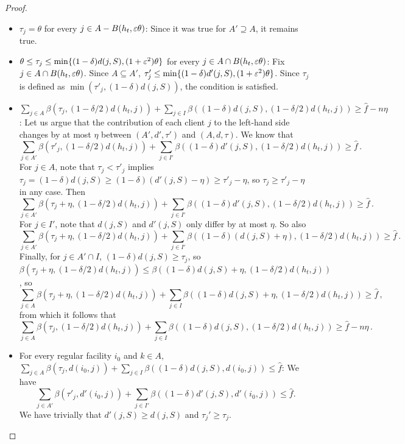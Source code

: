\begin{proof}
\begin{itemize}
    \item $\tau_j = \theta$ for every $j \in A - B(h_t, \varepsilon \theta)$: Since it was true for $A' \supseteq A$, it remains true. 
    \item $\theta \leq \tau_j \leq \min\{(1-\delta)d(j,S),(1+\varepsilon^2)\theta\}$ for every $j \in A \cap B(h_t, \varepsilon \theta)$: Fix $j \in A \cap B(h_t, \varepsilon \theta)$. 
    Since $A \subseteq A'$, $\tau'_j \leq \min\{(1-\delta)d'(j,S),(1+\varepsilon^2)\theta\}$. Since $\tau_j$ is defined as $\min(\tau'_j, (1-\delta)d(j,S))$, the condition is satisfied.
    \item $
    \sum_{j \in A} \beta(\tau_j, (1-\delta/2)d(h_t,j)) + \sum_{j \in I} \beta((1-\delta)d(j,S), (1-\delta/2)d(h_t,j)) \geq \hat f - n \eta$: Let us argue that the contribution of each client $j$ to the left-hand side changes by at most $\eta$ between $(A', d', \tau')$ and $(A, d, \tau)$.
    We know that 
    \[\sum_{j \in A'} \beta(\tau'_j, (1-\delta/2)d(h_t,j)) + \sum_{j \in I'} \beta((1-\delta)d'(j,S), (1-\delta/2)d(h_t,j)) \geq \hat f\,.\]
    For $j \in A$, note that $\tau_j < \tau'_j$ implies $\tau_j = (1-\delta)d(j, S) \geq (1-\delta)(d'(j, S) - \eta) \geq \tau'_j - \eta$, so $\tau_j \geq \tau'_j - \eta$ in any case.
    Then 
    \[\sum_{j \in A'} \beta(\tau_j + \eta, (1-\delta/2)d(h_t,j)) + \sum_{j \in I'} \beta((1-\delta)d'(j,S), (1-\delta/2)d(h_t,j)) \geq \hat f\,.\]
    For $j \in I'$, note that $d(j, S)$ and $d'(j, S)$ only differ by at most $\eta$.
    So also 
    \[\sum_{j \in A'} \beta(\tau_j + \eta, (1-\delta/2)d(h_t,j)) + \sum_{j \in I'} \beta((1-\delta)(d(j,S) + \eta), (1-\delta/2)d(h_t,j)) \geq \hat f\,.\]
    Finally, for $j \in A' \cap I$, $(1-\delta)d(j, S) \geq \tau_j$, so $\beta(\tau_j + \eta, (1-\delta/2)d(h_t, j)) \leq \beta((1-\delta)d(j,S)+\eta, (1-\delta/2)d(h_t, j))$, so 
    \[\sum_{j \in A} \beta(\tau_j + \eta, (1-\delta/2)d(h_t,j)) + \sum_{j \in I} \beta((1-\delta) d(j,S) + \eta, (1-\delta/2) d(h_t,j)) \geq \hat f\,,\]
    from which it follows that 
    \[\sum_{j \in A} \beta(\tau_j, (1-\delta/2)d(h_t,j)) +  \sum_{j \in I} \beta((1-\delta)d(j,S), (1-\delta/2)d(h_t,j)) \geq \hat f - n \eta\,.\]
    \item For every regular facility $i_0$ and $k \in A$, $
    \sum_{j \in A} \beta(\tau_j, d(i_0,j)) + \sum_{j \in I} \beta((1-\delta)d(j,S),d(i_0,j)) \leq \hat f$: We have
    \[
    \sum_{j \in A'} \beta(\tau'_j, d'(i_0,j)) + \sum_{j \in I'} \beta((1-\delta)d'(j,S), d'(i_0,j))
    \leq \hat f.
    \]
    We have trivially that $d'(j, S) \geq d(j, S)$ and $\tau_j' \geq \tau_j$.

\end{itemize}
\end{proof}
